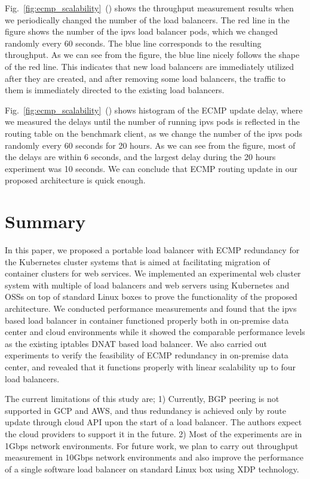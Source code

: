 Fig.~\ref{fig:ecmp_scalability}~() shows the throughput measurement results when we periodically changed the number of the load balancers. 
The red line in the figure shows the number of the ipvs load balancer pods, which we changed randomly every 60 seconds.
The blue line corresponds to the resulting throughput.
As we can see from the figure, the blue line nicely follows the shape of the red line.
This indicates that new load balancers are immediately utilized after they are created, and after removing some load balancers, the traffic to them is immediately directed to the existing load balancers.

Fig.~\ref{fig:ecmp_scalability}~() shows histogram of the ECMP update delay, where we measured the delays until the number of running ipvs pods is reflected in the routing table on the benchmark client, as we change the number of the ipvs pods randomly every 60 seconds for 20 hours.
As we can see from the figure, most of the delays are within 6 seconds, and the largest delay during the 20 hours experiment was 10 seconds.
We can conclude that ECMP routing update in our proposed architecture is quick enough.

\FloatBarrier

\section{Summary}\label{Conclusions}

In this paper, we proposed a portable load balancer with ECMP redundancy for the Kubernetes cluster systems that is aimed at facilitating migration of container clusters for web services.
We implemented an experimental web cluster system with multiple of load balancers and web servers using Kubernetes and OSSs on top of standard Linux boxes to prove the functionality of the proposed architecture.
We conducted performance measurements and found that the ipvs based load balancer in container functioned properly both in on-premise data center and cloud environments while it showed the comparable performance levels as the existing iptables DNAT based load balancer.
We also carried out experiments to verify the feasibility of ECMP redundancy in on-premise data center, and revealed that it functions properly with linear scalability up to four load balancers.

The current limitations of this study are;
1) Currently, BGP peering is not supported in GCP and AWS, and thus redundancy is achieved only by route update through cloud API upon the start of a load balancer.
The authors expect the cloud providers to support it in the future.
2) Most of the experiments are in 1Gbps network environments.
For future work, we plan to carry out throughput measurement in 10Gbps network environments and also improve the performance of a single software load balancer on standard Linux box using XDP technology.
